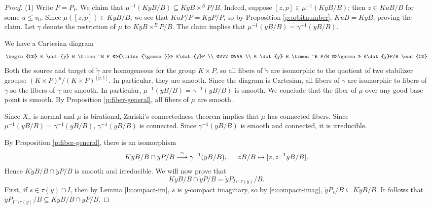 \documentclass[11pt,letterpaper,reqno]{amsart}
\numberwithin{equation}{section}
\theoremstyle{plain}
\theoremstyle{definition}
\theoremstyle{remark}
\begin{document}
\begin{proof}
(1) Write $P = P_I$.  We claim that $\mu^{-1}(K\dot{y}B/B) \subseteq K\dot{y}B \times^B P/B$.  Indeed, suppose $[z,p] \in \mu^{-1}(K\dot{y}B/B)$; then $z \in
K\dot{u}B/B$ for some $u \leq v_0$.  Since $\mu([z,p]) \in K\dot{y}B/B$, we see that $K\dot{u}P/P = K\dot{y}P/P$, so by Proposition \ref{p:orbitnumber}, $K\dot{u}B = K\dot{y}B$,
proving the claim.  Let $\gamma$ denote the restriction of $\mu$ to $K\dot{y}B \times^B P/B$.  The claim implies that $\mu^{-1}(\dot{y}B/B) = \gamma^{-1}(\dot{y}B/B)$.

We have a Cartesian diagram
$$
\begin{CD}
K \dot{y} B \times^B P @>{\tilde{\gamma}}>> K\dot{y}P \\
@VVV @VVV \\
K \dot{y} B \times^B P/B @>\gamma>> K\dot{y}P/B 
\end{CD}
$$
Both the source and target of $\tilde{\gamma}$ are homogeneous for the group $K \times P$, so all fibers of $\tilde{\gamma}$ are isomorphic to
the quotient of two stabilizer groups: $(K \times P)^{\dot{y}} / (K \times P)^{[\dot{y}, 1]}$.  In particular, they are smooth.
Since the diagram is Cartesian, all fibers of $\gamma$ are isomorphic to fibers of $\tilde{\gamma}$ so the fibers of $\gamma$ are smooth.  
In particular, $\mu^{-1}(\dot{y}B/B) = \gamma^{-1}(\dot{y}B/B)$ is smooth.  We conclude that the fiber of $\mu$ over any good base point is smooth.  By
Proposition \ref{p:fiber-general}, all fibers of $\mu$ are smooth.

Since $X_v$ is normal and $\mu$ is birational, Zariski's connectedness theorem implies that $\mu$ has connected fibers.  Since $\mu^{-1}(\dot{y}B/B) = \gamma^{-1}(\dot{y}B/B)$,
$\gamma^{-1}(\dot{y}B/B)$ is connected.
Since $\gamma^{-1}(\dot{y}B/B)$ is smooth and connected, it is irreducible.

By Proposition \ref{p:fiber-general}, there is an isomorphism
\begin{equation} \label{e:resolution}
 K\dot{y}B/B \cap \dot{y}P/B \stackrel{\cong}{\longrightarrow} \gamma^{-1}(\dot{y}B/B), \hspace{0.2in} zB/B \mapsto [z, z^{-1}\dot{y}B/B ].
\end{equation}
Hence $K\dot{y}B/B \cap \dot{y}P/B$ is smooth and irreducible.
We will now prove that
\begin{equation} \label{e.fiber}
K\dot{y}B/B \cap \dot{y}P/B = \dot{y}P_{I \cap \tau(y) }/B.
\end{equation}
First, 
if $s\in\tau(y)\cap I$, then
by Lemma \ref{l:compact-im}, $s$ is $y$-compact imaginary, so by \eqref{e:compact-imag}, $\dot{y}P_s/B\subseteq K\dot{y}B/B$.  It follows that
$\dot{y}P_{I \cap \tau(y) }/B \subseteq K\dot{y}B/B \cap \dot{y}P/B$.


\end{proof}
\end{document}
